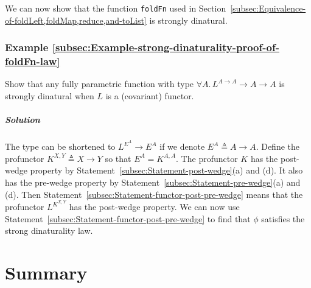 We can now show that the function \lstinline!foldFn! used in Section~\ref{subsec:Equivalence-of-foldLeft,foldMap,reduce,and-toList}
is strongly dinatural.

\subsubsection{Example \label{subsec:Example-strong-dinaturality-proof-of-foldFn-law}\ref{subsec:Example-strong-dinaturality-proof-of-foldFn-law}}

Show that any fully parametric function with type $\forall A.\,L^{A\rightarrow A}\rightarrow A\rightarrow A$
is strongly dinatural when $L$ is a (covariant) functor.

\subparagraph{Solution}

The type can be shortened to $L^{E^{A}}\rightarrow E^{A}$ if we denote
$E^{A}\triangleq A\rightarrow A$. Define the profunctor $K^{X,Y}\triangleq X\rightarrow Y$
so that $E^{A}=K^{A,A}$. The profunctor $K$ has the post-wedge property
by Statement~\ref{subsec:Statement-post-wedge}(a) and (d). It also
has the pre-wedge property by Statement~\ref{subsec:Statement-pre-wedge}(a)
and (d). Then Statement~\ref{subsec:Statement-functor-post-pre-wedge}
means that the profunctor $L^{K^{X,Y}}$ has the post-wedge property.
We can now use Statement~\ref{subsec:Statement-functor-post-pre-wedge}
to find that $\phi$ satisfies the strong dinaturality law. 

\section{Summary}

